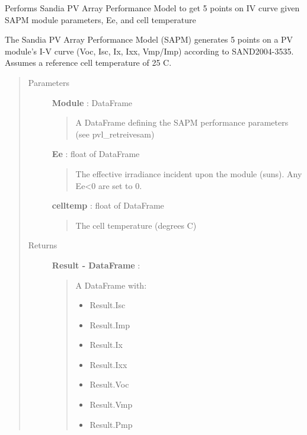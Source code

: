 \documentclass[letterpaper,10pt,english]{sphinxmanual}
\begin{document}
\begin{fulllineitems}
\label{stubs/pvlib.pvl_sapm:pvlib.pvl_sapm}
Performs Sandia PV Array Performance Model to get 5 points on IV curve given SAPM module parameters, Ee, and cell temperature

The Sandia PV Array Performance Model (SAPM) generates 5 points on a PV
module's I-V curve (Voc, Isc, Ix, Ixx, Vmp/Imp) according to
SAND2004-3535. Assumes a reference cell temperature of 25 C.
\begin{quote}\begin{description}
\item[{Parameters}] \leavevmode
\textbf{Module} : DataFrame
\begin{quote}

A DataFrame defining the SAPM performance parameters (see
pvl\_retreivesam)
\end{quote}

\textbf{Ee} : float of DataFrame
\begin{quote}

The effective irradiance incident upon the module (suns). Any Ee\textless{}0
are set to 0.
\end{quote}

\textbf{celltemp} : float of DataFrame
\begin{quote}

The cell temperature (degrees C)
\end{quote}

\item[{Returns}] \leavevmode
\textbf{Result - DataFrame} :
\begin{quote}

A DataFrame with:
\begin{itemize}
\item {} 
Result.Isc

\item {} 
Result.Imp

\item {} 
Result.Ix

\item {} 
Result.Ixx

\item {} 
Result.Voc

\item {} 
Result.Vmp

\item {} 
Result.Pmp


\end{itemize}
\end{quote}
\end{description}
\end{quote}
\end{fulllineitems}
\end{document}
